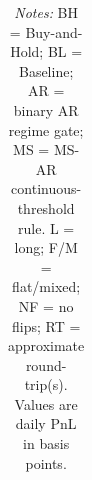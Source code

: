 \begin{table}[H]
\begin{tabular*}{\textwidth}{@{\extracolsep{\fill}} lllll}
\bottomrule
\end{tabular*}

\vspace{-0.3em}
\caption*{\scriptsize \textit{Notes:} BH = Buy-and-Hold; BL = Baseline; AR = binary AR regime gate; MS = MS-AR continuous-threshold rule. L = long; F/M = flat/mixed; NF = no flips; RT = approximate round-trip(s). Values are daily PnL in basis points.}
\end{table}


